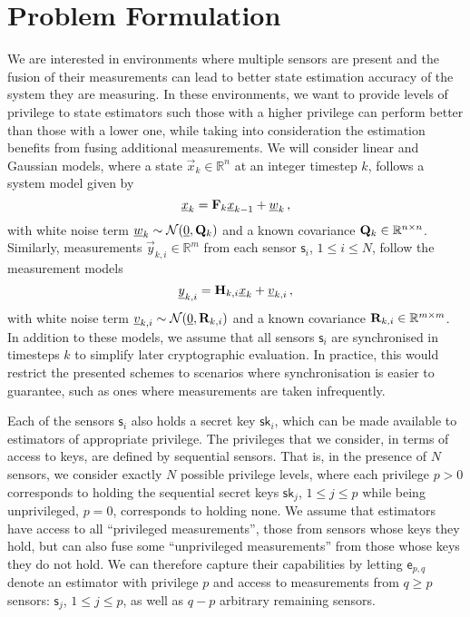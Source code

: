 \documentclass[conference]{IEEEtran}
\begin{document}
\section{Problem Formulation}\label{sec:prob}
We are interested in environments where multiple sensors are present and the fusion of their measurements can lead to better state estimation accuracy of the system they are measuring. In these environments, we want to provide levels of privilege to state estimators such those with a higher privilege can perform better than those with a lower one, while taking into consideration the estimation benefits from fusing additional measurements. We will consider linear and Gaussian models, where a state $\vec{x}_k \in \mathbb{R}^n$ at an integer timestep $k$, follows a system model given by
\begin{equation}
  {\underline{x}}_k = {{\mathbf{F}}}_k {\underline{x}}_{k-1} + {\underline{w}}_k\,,
\end{equation}
with white noise term ${\underline{w}}_k \sim \mathcal{N}({\underline{0}},{{\mathbf{Q}}}_k)$ and a known covariance ${{\mathbf{Q}}}_k \in \mathbb{R}^{n \times n}$. Similarly, measurements $\vec{y}_{k,i} \in \mathbb{R}^m$ from each sensor $\mathsf{s}_i$, $1\leq i\leq N$, follow the measurement models
\begin{equation}
  {\underline{y}}_{k,i} = {{\mathbf{H}}}_{k,i} {\underline{x}}_k + {\underline{v}}_{k,i}\,,
\end{equation}
with white noise term ${\underline{v}}_{k,i} \sim \mathcal{N}({\underline{0}},{{\mathbf{R}}}_{k,i})$ and a known covariance ${{\mathbf{R}}}_{k,i} \in \mathbb{R}^{m \times m}$. In addition to these models, we assume that all sensors $\mathsf{s}_i$ are synchronised in timesteps $k$ to simplify later cryptographic evaluation. In practice, this would restrict the presented schemes to scenarios where synchronisation is easier to guarantee, such as ones where measurements are taken infrequently.

Each of the sensors $\mathsf{s}_i$ also holds a secret key $\mathsf{sk}_i$, which can be made available to estimators of appropriate privilege. The privileges that we consider, in terms of access to keys, are defined by sequential sensors. That is, in the presence of $N$ sensors, we consider exactly $N$ possible privilege levels, where each privilege $p>0$ corresponds to holding the sequential secret keys $\mathsf{sk}_j$, $1\leq j \leq p$ while being unprivileged, $p=0$, corresponds to holding none. We assume that estimators have access to all ``privileged measurements'', those from sensors whose keys they hold, but can also fuse some ``unprivileged measurements'' from those whose keys they do not hold. We can therefore capture their capabilities by letting $\mathsf{e}_{p,q}$ denote an estimator with privilege $p$ and access to measurements from $q\geq p$ sensors: $\mathsf{s}_j$, $1\leq j \leq p$, as well as $q-p$ arbitrary remaining sensors.
\end{document}
